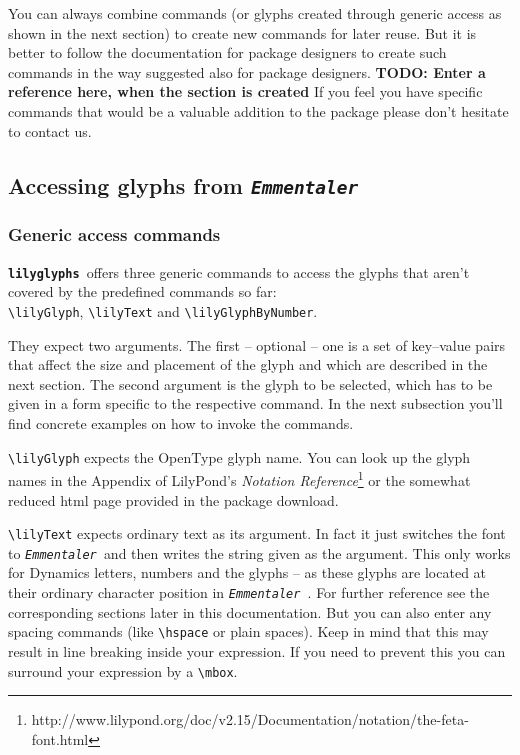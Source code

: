\documentclass{article}
\newcommand*{\lilyglyphs}{\texttt{\textbf{lilyglyphs\,}}}
\newcommand*{\emmentaler}{\texttt{\textit{Emmentaler }}}
\newcommand*{\cmd}[1]{\texttt{\textbackslash #1}}
\begin{document}
You can always combine commands (or glyphs created through generic access as shown in the next section) to create new commands for later reuse. 
But it is better to follow the documentation for package designers to create such commands in the way suggested also for package designers.
\textbf{TODO: Enter a reference here, when the section is created}
If you feel you have specific commands that would be a valuable addition to the package please don't hesitate to contact us.



\subsection{Accessing glyphs from \emmentaler}
\subsubsection{Generic access commands}
\lilyglyphs offers three generic commands to access the glyphs that aren't covered by the predefined commands so far: \\
\cmd{lilyGlyph}, \cmd{lilyText} and \cmd{lilyGlyphByNumber}. 

They expect two arguments. 
The first -- optional -- one is a set of key--value pairs that affect the size and placement of the glyph and which are described in the next section.
The second argument is the glyph to be selected, which has to be given in a form specific to the respective command.
In the next subsection you'll find concrete examples on how to invoke the commands.

\cmd{lilyGlyph} expects the OpenType glyph name. 
You can look up the glyph names in the Appendix of LilyPond's \emph{Notation Reference}\footnote{http://www.lilypond.org/doc/v2.15/Documentation/notation/the-feta-font.html} or the somewhat reduced html page provided in the package download.

\cmd{lilyText} expects ordinary text as its argument. 
In fact it just switches the font to \emmentaler and then writes the string given as the argument. 
This only works for Dynamics letters, numbers and the glyphs  -- as these glyphs are located at their ordinary character position in \emmentaler. 
For further reference see the corresponding sections later in this documentation. 
But you can also enter any spacing commands (like \cmd{hspace} or plain spaces). 
Keep in mind that this may result in line breaking inside your expression. 
If you need to prevent this you can surround your expression by a \cmd{mbox}.
\end{document}
